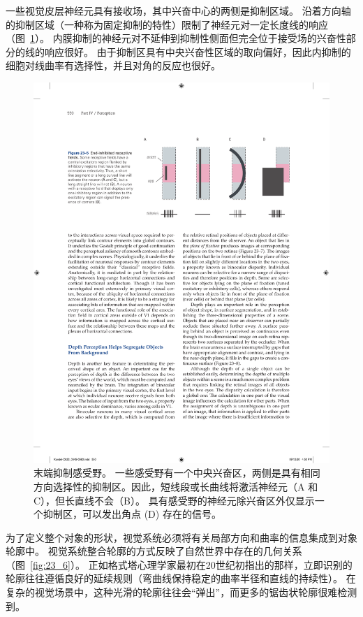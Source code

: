 一些视觉皮层神经元具有接收场，其中兴奋中心的两侧是抑制区域。
沿着方向轴的抑制区域（一种称为固定抑制的特性）限制了神经元对一定长度线的响应（图~\ref{fig:23_5}）。
内膜抑制的神经元对不延伸到抑制性侧面但完全位于接受场的兴奋性部分的线的响应很好。
由于抑制区具有中央兴奋性区域的取向偏好，因此内抑制的细胞对线曲率有选择性，并且对角的反应也很好。


\begin{figure}[htbp]
	\centering
	\includegraphics[width=0.7\linewidth]{chap23/fig_23_5}
	\caption{末端抑制感受野。
		一些感受野有一个中央兴奋区，两侧是具有相同方向选择性的抑制区。因此，短线段或长曲线将激活神经元（A 和 C），但长直线不会（B）。
		具有感受野的神经元除兴奋区外仅显示一个抑制区，可以发出角点 (D) 存在的信号。}
	\label{fig:23_5}
\end{figure}


为了定义整个对象的形状，视觉系统必须将有关局部方向和曲率的信息集成到对象轮廓中。
视觉系统整合轮廓的方式反映了自然世界中存在的几何关系（图~\ref{fig:23_6}）。
正如格式塔心理学家最初在20世纪初指出的那样，立即识别的轮廓往往遵循良好的延续规则（弯曲线保持稳定的曲率半径和直线的持续性）。
在复杂的视觉场景中，这种光滑的轮廓往往会“弹出”，而更多的锯齿状轮廓很难检测到。


